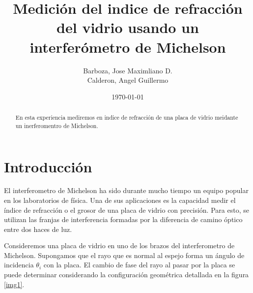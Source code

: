 \documentclass[a4paper, amsfonts, amssymb, amsmath, reprint, showkeys, nofootinbib, twoside]{revtex4-2}
\begin{document}
\title{Medición del indice de refracción del vidrio usando un interferómetro de Michelson}


\author{Barboza, Jose Maximliano D.\\
Calderon, Angel Guillermo}

  


\date{\today} %

\begin{abstract}
En esta experiencia mediremos en indice de refracción de una placa de vidrio meidante un inerferomentro de Michelson. 
\end{abstract}

\maketitle

\section{Introducción}

El interferometro de Michelson ha sido durante mucho tiempo un equipo popular en los laboratorios de física. Una de sus aplicaciones es la capacidad medir el índice de refracción o el grosor de una placa de vidrio con precisión. Para esto, se utilizan las franjas de interferencia formadas por la diferencia de camino óptico entre dos haces de luz.

Consideremos una placa de vidrio en uno de los brazos del interferometro de Michelson. Supongamos que el rayo que es normal al espejo forma un ángulo de incidencia $\theta_i$ con la placa. El cambio de fase del rayo al pasar por la placa se puede determinar considerando la configuración geométrica detallada en la figura \ref{img1}.
\end{document}
